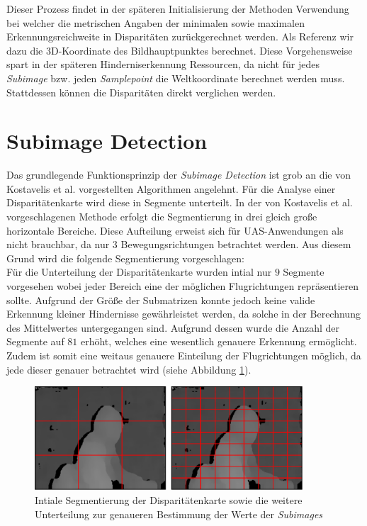 \noindent
Dieser Prozess findet in der späteren Initialisierung der Methoden Verwendung bei welcher die metrischen Angaben der minimalen sowie maximalen  Erkennungsreichweite in Disparitäten zurückgerechnet werden. Als Referenz wir dazu die 3D-Koordinate des Bildhauptpunktes berechnet. Diese Vorgehensweise spart in der späteren Hinderniserkennung Ressourcen, da nicht für jedes \emph{Subimage} bzw. jeden \emph{Samplepoint} die Weltkoordinate berechnet werden muss. Stattdessen können die Disparitäten direkt verglichen werden.

\section{Subimage Detection}
\label{sec:mean_disparity_detection}

Das grundlegende Funktionsprinzip der \emph{Subimage Detection} ist grob an die von Kostavelis et al. vorgestellten Algorithmen angelehnt. Für die Analyse einer Disparitätenkarte wird diese in Segmente unterteilt. In der von Kostavelis et al. vorgeschlagenen Methode erfolgt die Segmentierung in drei gleich große horizontale Bereiche. Diese Aufteilung erweist sich für UAS-Anwendungen als nicht brauchbar, da nur 3 Bewegungsrichtungen betrachtet werden. Aus diesem Grund wird die folgende Segmentierung vorgeschlagen:\\

\noindent
Für die Unterteilung der Disparitätenkarte wurden intial nur $9$ Segmente vorgesehen wobei jeder Bereich eine der möglichen Flugrichtungen repräsentieren sollte. Aufgrund der Größe der Submatrizen konnte jedoch keine valide Erkennung kleiner Hindernisse gewährleistet werden, da solche in der Berechnung des Mittelwertes untergegangen sind. Aufgrund dessen wurde die Anzahl der Segmente auf $81$ erhöht, welches eine wesentlich genauere Erkennung ermöglicht. Zudem ist somit eine weitaus genauere Einteilung der Flugrichtungen möglich, da jede dieser genauer betrachtet wird (siehe Abbildung \ref{fig:subimage_detection_segments}).\\

\begin{figure}[h]
	\begin{center}
		\includegraphics[width=10cm]{img/subimage_segmentation.pdf}
	\end{center}
	\caption{Intiale Segmentierung der Disparitätenkarte sowie die weitere Unterteilung zur genaueren Bestimmung der Werte der \emph{Subimages}}
	\label{fig:subimage_detection_segments}
\end{figure}

